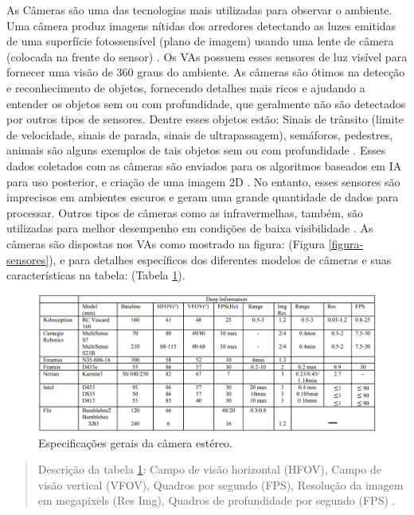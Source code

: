 
As Câmeras são uma das tecnologias mais utilizadas para observar o ambiente. Uma câmera produz imagens nítidas dos arredores detectando as luzes emitidas de uma superfície fotossensível (plano de imagem) usando uma lente de câmera (colocada na frente do sensor) \cite{sensors}. Os VAs possuem esses sensores de luz visível para fornecer uma visão de 360 graus do ambiente. As câmeras são ótimos na detecção e reconhecimento de objetos, fornecendo detalhes mais ricos e ajudando a entender os objetos sem ou com profundidade, que geralmente não são detectados por outros tipos de sensores. Dentre esses objetos estão: Sinais de trânsito (limite de velocidade, sinais de parada, sinais de ultrapassagem), semáforos, pedestres, animais são alguns exemplos de tais objetos sem ou com profundidade \cite{sensors-yet}. Esses dados coletados com as câmeras são enviados para os algoritmos baseados em IA para uso posterior, e criação de uma imagem 2D \cite{aplicacao2}. 
No entanto, esses sensores são imprecisos em ambientes escuros e geram uma grande quantidade de dados para processar. Outros tipos de câmeras como as infravermelhas, também, são utilizadas para melhor desempenho em condições de baixa visibilidade \cite{review-auto}. As câmeras são dispostas nos VAs como mostrado na figura: (Figura \ref{figura-sensores}), e para detalhes específicos dos diferentes modelos de câmeras e suas características na tabela: (Tabela \ref{tabela-camera}).

\begin{figure}[H]
\centering
\includegraphics[width=\textwidth]{Figures/camera-table.png}
\caption{Especificações gerais da câmera estéreo.}
\label{tabela-camera}
\end{figure}
\begin{quote}
Descrição da tabela \ref{tabela-camera}: Campo de visão horizontal (HFOV), Campo de visão vertical (VFOV), Quadros por segundo (FPS), Resolução da imagem em megapixels (Res Img), Quadros de profundidade por segundo (FPS) \cite{sensors}.
\end{quote}

